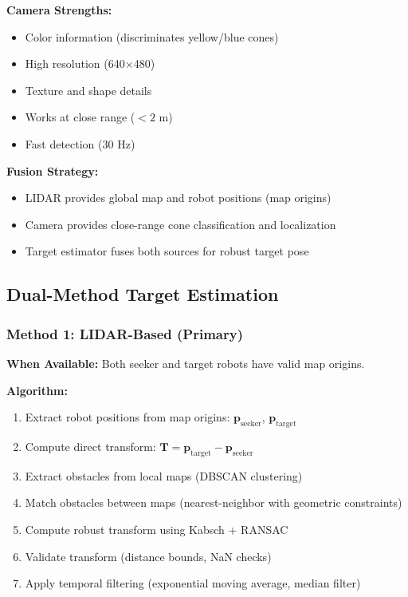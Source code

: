 \documentclass[11pt]{article}
\begin{document}
\textbf{Camera Strengths:}
\begin{itemize}
    \item Color information (discriminates yellow/blue cones)
    \item High resolution (640$\times$480)
    \item Texture and shape details
    \item Works at close range ($< 2$ m)
    \item Fast detection (30 Hz)
\end{itemize}

\textbf{Fusion Strategy:}
\begin{itemize}
    \item LIDAR provides global map and robot positions (map origins)
    \item Camera provides close-range cone classification and localization
    \item Target estimator fuses both sources for robust target pose
\end{itemize}

\subsection{Dual-Method Target Estimation}

\subsubsection{Method 1: LIDAR-Based (Primary)}

\textbf{When Available:} Both seeker and target robots have valid map origins.

\textbf{Algorithm:}
\begin{enumerate}
    \item Extract robot positions from map origins: $\mathbf{p}_{\text{seeker}}$, $\mathbf{p}_{\text{target}}$
    \item Compute direct transform: $\mathbf{T} = \mathbf{p}_{\text{target}} - \mathbf{p}_{\text{seeker}}$
    \item Extract obstacles from local maps (DBSCAN clustering)
    \item Match obstacles between maps (nearest-neighbor with geometric constraints)
    \item Compute robust transform using Kabsch + RANSAC
    \item Validate transform (distance bounds, NaN checks)
    \item Apply temporal filtering (exponential moving average, median filter)
\end{enumerate}
\end{document}
